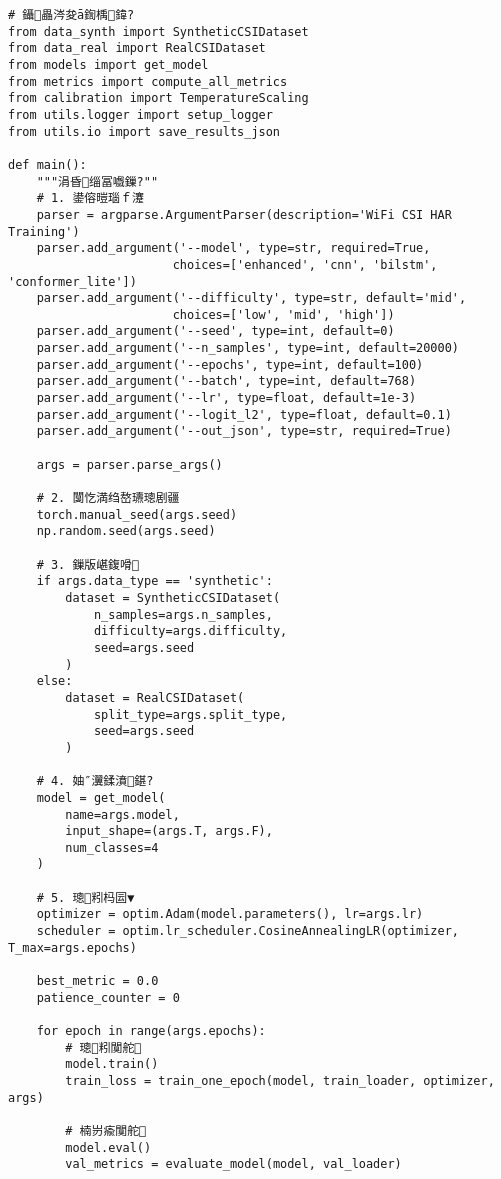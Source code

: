 {{{{{{{{{{{{{{{{{\begin{lstlisting}
# 鑷畾涔夋ā鍧楀鍏?
from data_synth import SyntheticCSIDataset
from data_real import RealCSIDataset
from models import get_model
from metrics import compute_all_metrics
from calibration import TemperatureScaling
from utils.logger import setup_logger
from utils.io import save_results_json

def main():
    """涓昏缁冨嚱鏁?""
    # 1. 鍙傛暟瑙ｆ瀽
    parser = argparse.ArgumentParser(description='WiFi CSI HAR Training')
    parser.add_argument('--model', type=str, required=True,
                       choices=['enhanced', 'cnn', 'bilstm', 'conformer_lite'])
    parser.add_argument('--difficulty', type=str, default='mid',
                       choices=['low', 'mid', 'high'])
    parser.add_argument('--seed', type=int, default=0)
    parser.add_argument('--n_samples', type=int, default=20000)
    parser.add_argument('--epochs', type=int, default=100)
    parser.add_argument('--batch', type=int, default=768)
    parser.add_argument('--lr', type=float, default=1e-3)
    parser.add_argument('--logit_l2', type=float, default=0.1)
    parser.add_argument('--out_json', type=str, required=True)
    
    args = parser.parse_args()
    
    # 2. 闅忔満绉嶅瓙璁剧疆
    torch.manual_seed(args.seed)
    np.random.seed(args.seed)
    
    # 3. 鏁版嵁鍑嗗
    if args.data_type == 'synthetic':
        dataset = SyntheticCSIDataset(
            n_samples=args.n_samples,
            difficulty=args.difficulty,
            seed=args.seed
        )
    else:
        dataset = RealCSIDataset(
            split_type=args.split_type,
            seed=args.seed
        )
    
    # 4. 妯″瀷鍒濆鍖?
    model = get_model(
        name=args.model,
        input_shape=(args.T, args.F),
        num_classes=4
    )
    
    # 5. 璁粌杩囩▼
    optimizer = optim.Adam(model.parameters(), lr=args.lr)
    scheduler = optim.lr_scheduler.CosineAnnealingLR(optimizer, T_max=args.epochs)
    
    best_metric = 0.0
    patience_counter = 0
    
    for epoch in range(args.epochs):
        # 璁粌闃舵
        model.train()
        train_loss = train_one_epoch(model, train_loader, optimizer, args)
        
        # 楠岃瘉闃舵
        model.eval()
        val_metrics = evaluate_model(model, val_loader)
        

\end{lstlisting}}}}}}}}}}}}}}}}}}
